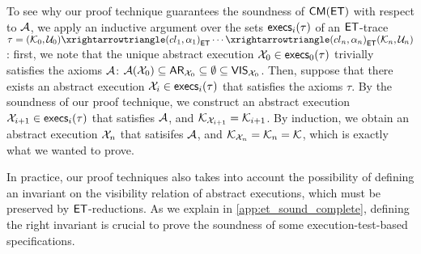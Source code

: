 To see why our proof technique guarantees the soundness of $\CMs(\ET)$ with respect 
to $\mathcal{A}$, we apply an inductive argument over the sets $\execs_{i}(\tau)$ of an $\mathsf{ET}$-trace $\tau = 
(\mkvs_{0}, \vienv_{0})  \toET{(\cl_{1}, \alpha_{1})} \cdots  \toET{(\cl_{n}, \alpha_{n})} (\mkvs_{n}, \vienv_{n})$: 
first, we note that the unique abstract execution $\aexec_{0} \in \execs_{0}(\tau)$ trivially satisfies the axioms
$\mathcal{A}$: $\mathcal{A}(\mathcal{X}_{0}) \subseteq \mathsf{AR}_{\mathcal{X}_{0}} \subseteq \emptyset \subseteq \mathsf{VIS}_{\mathcal{X}_{0}}$. 
Then, suppose that there exists an abstract execution $\aexec_{i} \in \execs_{i}(\tau)$ that satisfies 
the axioms $\tau$. By the soundness of our proof technique, we construct an abstract execution 
$\aexec_{i+1} \in \execs_{i}(\tau)$ that satisfies $\mathcal{A}$, and $\mathcal{K}_{\mathcal{X}_{i+1}} = \mathcal{K}_{i+1}$. 
By induction, we obtain an abstract execution $\mathcal{X}_{n}$  that satisifes $\mathcal{A}$, and $\mathcal{K}_{\mathcal{X}_{n}} = \mathcal{K}_{n} = \mathcal{K}$, 
which is exactly what we wanted to prove.
%

In practice, our proof techniques also takes into account the possibility of defining an invariant 
on the visibility relation of abstract executions, which must be preserved by $\mathsf{ET}$-reductions. As we explain in \cref{app:et_sound_complete}, defining the right invariant 
is crucial to prove the soundness of some execution-test-based specifications.

